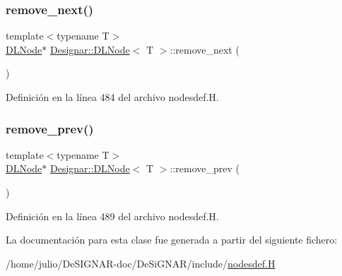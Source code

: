 \subsubsection{\texorpdfstring{remove\+\_\+next()}{remove\_next()}}
{\footnotesize\ttfamily template$<$typename T$>$ \\
\hyperlink{class_designar_1_1_d_l_node}{D\+L\+Node}$\ast$ \hyperlink{class_designar_1_1_d_l_node}{Designar\+::\+D\+L\+Node}$<$ T $>$\+::remove\+\_\+next (\begin{DoxyParamCaption}{ }\end{DoxyParamCaption})\hspace{0.3cm}{\ttfamily [inline]}}



Definición en la línea 484 del archivo nodesdef.\+H.

\mbox{\label{class_designar_1_1_d_l_node_a0bd2bf491ab61ab3fd1eb6b8b06dcae5}} 
\subsubsection{\texorpdfstring{remove\+\_\+prev()}{remove\_prev()}}
{\footnotesize\ttfamily template$<$typename T$>$ \\
\hyperlink{class_designar_1_1_d_l_node}{D\+L\+Node}$\ast$ \hyperlink{class_designar_1_1_d_l_node}{Designar\+::\+D\+L\+Node}$<$ T $>$\+::remove\+\_\+prev (\begin{DoxyParamCaption}{ }\end{DoxyParamCaption})\hspace{0.3cm}{\ttfamily [inline]}}



Definición en la línea 489 del archivo nodesdef.\+H.



La documentación para esta clase fue generada a partir del siguiente fichero\+:\begin{DoxyCompactItemize}
\item 
/home/julio/\+De\+S\+I\+G\+N\+A\+R-\/doc/\+De\+Si\+G\+N\+A\+R/include/\hyperlink{nodesdef_8_h}{nodesdef.\+H}\end{DoxyCompactItemize}
